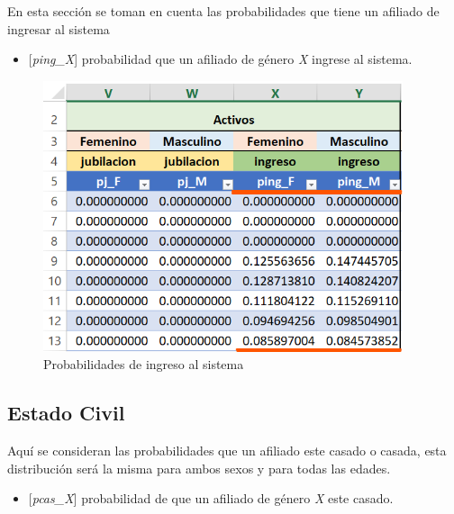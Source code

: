 \documentclass[
  letterpaper,
  DIV=11,
  numbers=noendperiod]{scrreprt}
\providecommand{\tightlist}{%
  \setlength{\itemsep}{0pt}\setlength{\parskip}{0pt}}\usepackage{longtable,booktabs,array}
\begin{document}
En esta sección se toman en cuenta las probabilidades que tiene un
afiliado de ingresar al sistema

\begin{itemize}
\tightlist
\item
  {[}\emph{ping\_X}{]} probabilidad que un afiliado de género \emph{X}
  ingrese al sistema.
\end{itemize}

\begin{figure}

{\centering \includegraphics[width=4.15625in,height=\textheight]{images/F/Img5.png}

}

\caption{Probabilidades de ingreso al sistema}

\end{figure}

\hypertarget{estado-civil}{%
\subsection{Estado Civil}\label{estado-civil}}

Aquí se consideran las probabilidades que un afiliado este casado o
casada, esta distribución será la misma para ambos sexos y para todas
las edades.

\begin{itemize}
\tightlist
\item
  {[}\emph{pcas\_X}{]} probabilidad de que un afiliado de género
  \emph{X} este casado.
\end{itemize}
\end{document}

